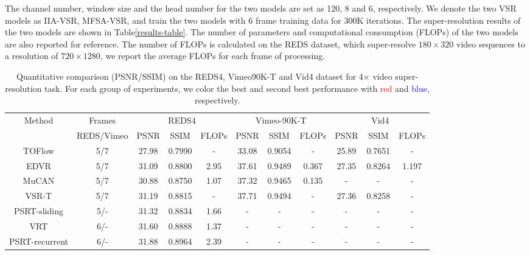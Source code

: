 \documentclass[10pt,twocolumn,letterpaper]{article}
\begin{document}
%
The channel number, window size and the head number for the two models are set as 120, 8 and 6, respectively.
%
We denote the two VSR models as IIA-VSR, MFSA-VSR, and train the two models with 6 frame training data for 300K iterations.
%
The super-resolution results of the two models are shown in Table\ref{results-table}.
%
The number of parameters and computational consumption (FLOPs) of the two models are also reported for reference.
%
The number of FLOPs is calculated on the REDS dataset, which super-resolve $180 \times 320$ video sequences to a resolution of $720 \times 1280$, we report the average FLOPs for each frame of processing.
%
\begin{table*}
	\renewcommand{\arraystretch}{0.9}
	\renewcommand{\tabcolsep}{4pt}
    \caption{Quantitative comparison (PSNR/SSIM) on the REDS4\cite{nah2019ntire}, Vimeo90K-T\cite{xue2019video} and Vid4\cite{liu2013bayesian} dataset for 4× video super-resolution task. For each group of experiments, we color the best and second best performance with \textcolor{red}{red} and \textcolor{blue}{blue}, respectively.}
    \label{tab:sota-table}
    \begin{adjustbox}{center}
    \centering
    \begin{tabular}{c|c||ccc|ccc|ccc}%
    \toprule
    \multirow{2}{*}{Method} & Frames  & \multicolumn{3}{c}{REDS4} & \multicolumn{3}{c}{Vimeo-90K-T} & \multicolumn{3}{c}{Vid4}  \\
    & REDS/Vimeo& PSNR & SSIM&FLOPs & PSNR & SSIM&FLOPs & PSNR & SSIM&FLOPs    \\
    \midrule
    TOFlow\cite{xue2019video} & 5/7 & 27.98 & 0.7990&- &33.08 & 0.9054 &-&25.89&0.7651& - \\
    EDVR\cite{wang2019edvr} & 5/7 & 31.09 & 0.8800&2.95 & 37.61 & 0.9489 &0.367& 27.35& 0.8264&1.197\\
    MuCAN\cite{li2020mucan} & 5/7 & 30.88 & 0.8750& 1.07& 37.32 & 0.9465 &0.135& -&-&- \\
    VSR-T\cite{cao2021video} & 5/7 &31.19 & 0.8815& -& 37.71 & 0.9494&- & 27.36&0.8258& -\\
    PSRT-sliding\cite{shi2022rethinking} & 5/- &  31.32 & 0.8834 & 1.66 & - & -& -& -& -& - \\
    VRT\cite{liang2022vrt} & 6/- &31.60 & 0.8888 & 1.37 & - & -& -& -& -& - \\
    PSRT-recurrent\cite{shi2022rethinking} & 6/- & 31.88 & 0.8964 & 2.39 & - & -&  -& -& -& -\\

\end{tabular}
\end{adjustbox}
\end{table*}
\end{document}
